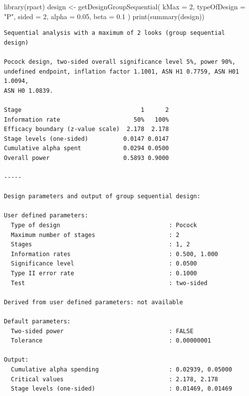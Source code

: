 \documentclass[
  letterpaper,
  DIV=11,
  numbers=noendperiod]{scrreprt}
\newenvironment{Shaded}{\begin{snugshade}}{\end{snugshade}}
\newcommand{\AttributeTok}[1]{\textcolor[rgb]{0.40,0.45,0.13}{#1}}
\newcommand{\DecValTok}[1]{\textcolor[rgb]{0.68,0.00,0.00}{#1}}
\newcommand{\FloatTok}[1]{\textcolor[rgb]{0.68,0.00,0.00}{#1}}
\newcommand{\FunctionTok}[1]{\textcolor[rgb]{0.28,0.35,0.67}{#1}}
\newcommand{\NormalTok}[1]{\textcolor[rgb]{0.00,0.23,0.31}{#1}}
\newcommand{\OtherTok}[1]{\textcolor[rgb]{0.00,0.23,0.31}{#1}}
\newcommand{\StringTok}[1]{\textcolor[rgb]{0.13,0.47,0.30}{#1}}
\begin{document}
\begin{Shaded}
\begin{Highlighting}[]
\FunctionTok{library}\NormalTok{(rpact)}
\NormalTok{design }\OtherTok{\textless{}{-}} \FunctionTok{getDesignGroupSequential}\NormalTok{(}
  \AttributeTok{kMax =} \DecValTok{2}\NormalTok{,}
  \AttributeTok{typeOfDesign =} \StringTok{"P"}\NormalTok{,}
  \AttributeTok{sided =} \DecValTok{2}\NormalTok{,}
  \AttributeTok{alpha =} \FloatTok{0.05}\NormalTok{,}
  \AttributeTok{beta =} \FloatTok{0.1}
\NormalTok{)}
\FunctionTok{print}\NormalTok{(}\FunctionTok{summary}\NormalTok{(design))}
\end{Highlighting}
\end{Shaded}

\begin{verbatim}
Sequential analysis with a maximum of 2 looks (group sequential design)

Pocock design, two-sided overall significance level 5%, power 90%, 
undefined endpoint, inflation factor 1.1001, ASN H1 0.7759, ASN H01 1.0094, 
ASN H0 1.0839.

Stage                                  1      2 
Information rate                     50%   100% 
Efficacy boundary (z-value scale)  2.178  2.178 
Stage levels (one-sided)          0.0147 0.0147 
Cumulative alpha spent            0.0294 0.0500 
Overall power                     0.5893 0.9000 

-----

Design parameters and output of group sequential design:

User defined parameters:
  Type of design                               : Pocock 
  Maximum number of stages                     : 2 
  Stages                                       : 1, 2 
  Information rates                            : 0.500, 1.000 
  Significance level                           : 0.0500 
  Type II error rate                           : 0.1000 
  Test                                         : two-sided 

Derived from user defined parameters: not available

Default parameters:
  Two-sided power                              : FALSE 
  Tolerance                                    : 0.00000001 

Output:
  Cumulative alpha spending                    : 0.02939, 0.05000 
  Critical values                              : 2.178, 2.178 
  Stage levels (one-sided)                     : 0.01469, 0.01469 
\end{verbatim}
\end{document}
